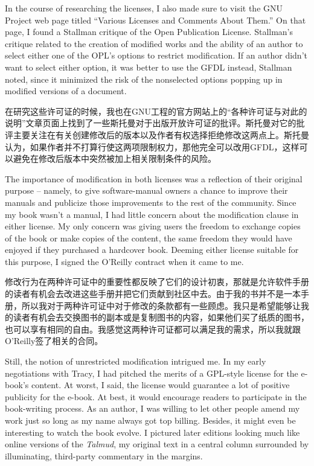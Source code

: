\ifdefined\eng
In the course of researching the licenses, I also made sure to visit the GNU Project web page titled ``Various Licenses and Comments About Them.'' On that page, I found a Stallman critique of the Open Publication License. Stallman's critique related to the creation of modified works and the ability of an author to select either one of the OPL's options to restrict modification. If an author didn't want to select either option, it was better to use the GFDL instead, Stallman noted, since it minimized the risk of the nonselected options popping up in modified versions of a document.
\fi

\ifdefined\chs
在研究这些许可证的时候，我也在GNU工程的官方网站上的``各种许可证与对此的说明''文章页面上找到了一些斯托曼对于出版开放许可证的批评。斯托曼对它的批评主要关注在有关创建修改后的版本以及作者有权选择拒绝修改这两点上。斯托曼认为，如果作者并不打算行使这两项限制权力，那他完全可以改用GFDL，这样可以避免在修改后版本中突然被加上相关限制条件的风险。
\fi

\ifdefined\eng
The importance of modification in both licenses was a reflection of their original purpose -- namely, to give software-manual owners a chance to improve their manuals and publicize those improvements to the rest of the community. Since my book wasn't a manual, I had little concern about the modification clause in either license. My only concern was giving users the freedom to exchange copies of the book or make copies of the content, the same freedom they would have enjoyed if they purchased a hardcover book. Deeming either license suitable for this purpose, I signed the O'Reilly contract when it came to me.
\fi

\ifdefined\chs
修改行为在两种许可证中的重要性都反映了它们的设计初衷，那就是允许软件手册的读者有机会去改进这些手册并把它们贡献到社区中去。由于我的书并不是一本手册，所以我对于两种许可证中对于修改的条款都有一些顾虑。我只是希望能够让我的读者有机会去交换图书的副本或是复制图书的内容，如果他们买了纸质的图书，也可以享有相同的自由。我感觉这两种许可证都可以满足我的需求，所以我就跟O'Reilly签了相关的合同。
\fi

\ifdefined\eng
Still, the notion of unrestricted modification intrigued me. In my early negotiations with Tracy, I had pitched the merits of a GPL-style license for the e-book's content. At worst, I said, the license would guarantee a lot of positive publicity for the e-book. At best, it would encourage readers to participate in the book-writing process. As an author, I was willing to let other people amend my work just so long as my name always got top billing. Besides, it might even be interesting to watch the book evolve. I pictured later editions looking much like online versions of the \textit{Talmud}, my original text in a central column surrounded by illuminating, third-party commentary in the margins.
\fi

